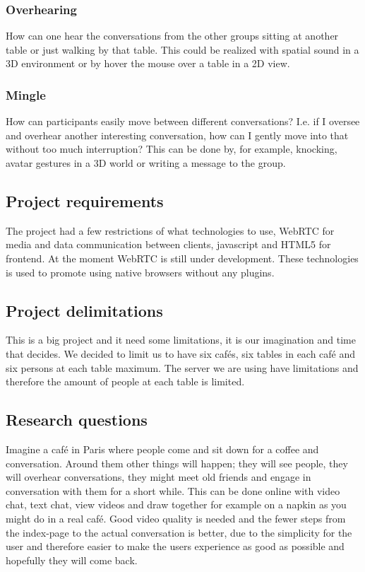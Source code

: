 \documentclass[12pt, titlepage]{article}
\begin{document}
\subsubsection{Overhearing}
How can one hear the conversations from the other groups sitting at another table or just walking by that table. This could be realized with spatial sound in a 3D environment or by hover the mouse over a table in a 2D view.
\subsubsection{Mingle}
How can participants easily move between different conversations? I.e. if I oversee and overhear another interesting conversation, how can I gently move into that without too much interruption? This can be done by, for example, knocking, avatar gestures in a 3D world or writing a message to the group.

\subsection{Project requirements}
The project had a few restrictions of what technologies to use, WebRTC for media and data communication between clients, javascript and HTML5 for frontend. At the moment WebRTC is still under development. These technologies is used to promote using native browsers without any plugins.
\subsection{Project delimitations}
This is a big project and it need some limitations, it is our imagination and time that decides. We decided to limit us to have six cafés, six tables in each café and six persons at each table maximum. The server we are using have limitations and therefore the amount of people at each table is limited.
\subsection{Research questions}
Imagine a café in Paris where people come and sit down for a coffee and conversation. Around them other things will happen; they will see people, they will overhear conversations, they might meet old friends and engage in conversation with them for a short while. This can be done online with video chat, text chat, view videos and draw together for example on a napkin as you might do in a real café. Good video quality is needed and the fewer steps from the index-page to the actual conversation is better, due to the simplicity for the user and therefore easier to make the users experience as good as possible and hopefully they will come back.
\end{document}
